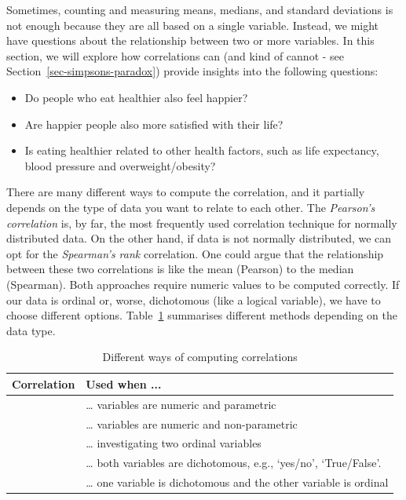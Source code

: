 \documentclass[
  letterpaper,
  DIV=11,
  numbers=noendperiod]{scrreprt}
\begin{document}
Sometimes, counting and measuring means, medians, and standard
deviations is not enough because they are all based on a single
variable. Instead, we might have questions about the relationship
between two or more variables. In this section, we will explore how
correlations can (and kind of cannot - see
Section~\ref{sec-simpsons-paradox}) provide insights into the following
questions:

\begin{itemize}
\item
  Do people who eat healthier also feel happier?
\item
  Are happier people also more satisfied with their life?
\item
  Is eating healthier related to other health factors, such as life
  expectancy, blood pressure and overweight/obesity?
\end{itemize}

There are many different ways to compute the correlation, and it
partially depends on the type of data you want to relate to each other.
The \emph{Pearson's correlation} is, by far, the most frequently used
correlation technique for normally distributed data. On the other hand,
if data is not normally distributed, we can opt for the \emph{Spearman's
rank} correlation. One could argue that the relationship between these
two correlations is like the mean (Pearson) to the median (Spearman).
Both approaches require numeric values to be computed correctly. If our
data is ordinal or, worse, dichotomous (like a logical variable), we
have to choose different options. Table~\ref{tbl-different-correlations}
summarises different methods depending on the data type.

\begingroup
\fontsize{9.0pt}{10.8pt}\selectfont

\begin{longtable}{>{\raggedright\arraybackslash}p{\dimexpr 67.50pt -2\tabcolsep-1.5\arrayrulewidth}>{\raggedright\arraybackslash}p{\dimexpr 270.00pt -2\tabcolsep-1.5\arrayrulewidth}}

\caption{\label{tbl-different-correlations}Different ways of computing
correlations}

\tabularnewline

\toprule
Correlation & Used when ... \\ 
\midrule\addlinespace[2.5pt]
{\itshape Pearson} & \ldots{} variables are numeric and parametric \\ 
{\itshape Spearman} & \ldots{} variables are numeric and non-parametric \\ 
{\itshape Polychoric} & \ldots{} investigating two ordinal variables \\ 
{\itshape Tetrachoric} & \ldots{} both variables are dichotomous, e.g., `yes/no', `True/False'. \\ 
{\itshape Rank-biserial} & \ldots{} one variable is dichotomous and the other variable is ordinal \\ 
\bottomrule

\end{longtable}
\end{document}
